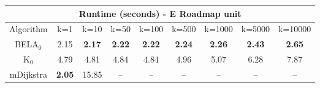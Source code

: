 \begin{tabular}{c|cccccccc}\toprule
\multicolumn{9}{c}{Runtime (seconds) - E Roadmap unit}\\ \midrule
Algorithm & k=1 & k=10 & k=50 & k=100 & k=500 & k=1000 & k=5000 & k=10000 \\ \midrule
BELA$_0$ & 2.15 & \textbf{2.17} & \textbf{2.22} & \textbf{2.22} & \textbf{2.24} & \textbf{2.26} & \textbf{2.43} & \textbf{2.65} \\
K$_0$ & 4.79 & 4.81 & 4.84 & 4.84 & 4.96 & 5.07 & 6.28 & 7.87 \\
mDijkstra & \textbf{2.05} & 15.85 & -- & -- & -- & -- & -- & -- \\ \bottomrule 
\end{tabular}
